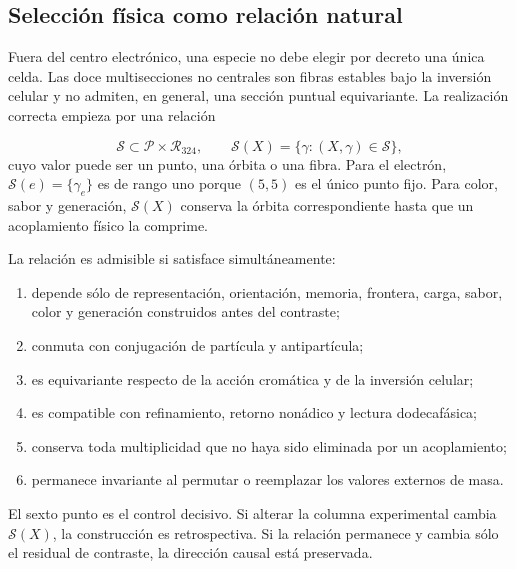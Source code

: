 \subsection{Selección física como relación natural}
Fuera del centro electrónico, una especie no debe elegir por decreto una única celda. Las doce multisecciones no centrales son fibras estables bajo la inversión celular y no admiten, en general, una sección puntual equivariante. La realización correcta empieza por una relación

\[
\mathscr S\subset \mathcal P\times\mathcal R_{324},
\qquad
\mathscr S(X)=\{\gamma:(X,\gamma)\in\mathscr S\},
\]
cuyo valor puede ser un punto, una órbita o una fibra. Para el electrón, \(\mathscr S(e)=\{\gamma_e\}\) es de rango uno porque \((5,5)\) es el único punto fijo. Para color, sabor y generación, \(\mathscr S(X)\) conserva la órbita correspondiente hasta que un acoplamiento físico la comprime.

La relación es admisible si satisface simultáneamente:

\begin{enumerate}
\item depende sólo de representación, orientación, memoria, frontera, carga,
sabor, color y generación construidos antes del contraste;

\item conmuta con conjugación de partícula y antipartícula;
\item es equivariante respecto de la acción cromática y de la inversión celular;
\item es compatible con refinamiento, retorno nonádico y lectura dodecafásica;
\item conserva toda multiplicidad que no haya sido eliminada por un acoplamiento;
\item permanece invariante al permutar o reemplazar los valores externos de masa.
\end{enumerate}
El sexto punto es el control decisivo. Si alterar la columna experimental cambia \(\mathscr S(X)\), la construcción es retrospectiva. Si la relación permanece y cambia sólo el residual de contraste, la dirección causal está preservada.

